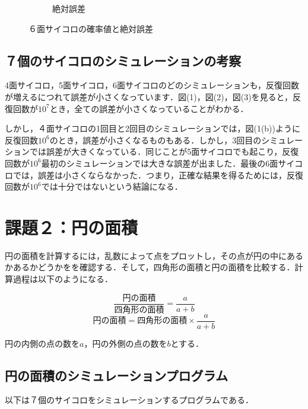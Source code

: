 \documentclass[a4j, titlepage]{jarticle}
\begin{document}
\begin{figure}[htb]
\begin{subfigure}[b]{0.38\textwidth}
          \caption{絶対誤差}
          \label{fig:errdic6}
        \end{subfigure}
        \hfill
            \caption{６面サイコロの確率値と絶対誤差}
            \label{fig:resdic6}
      \end{figure}

    \subsection{７個のサイコロのシミュレーションの考察}
      4面サイコロ，5面サイコロ，6面サイコロのどのシミュレーションも，反復回数が増えるにつれて誤差が小さくなっています．図(1)，図(2)，図(3)を見ると，反復回数が$10^7$とき，全ての誤差が小さくなっていることがわかる．

      しかし，４面サイコロの1回目と2回目のシミュレーションでは，図(1(b))ように反復回数$10^6$のとき，誤差が小さくなるものもある．しかし，3回目のシミュレーションでは誤差が大きくなっている．同じことが5面サイコロでも起こり，反復回数が$10^6$最初のシミュレーションでは大きな誤差が出ました．最後の6面サイコロでは，誤差は小さくならなかった．つまり，正確な結果を得るためには，反復回数が$10^6$では十分ではないという結論になる．
  
  \section{課題２：円の面積}
    円の面積を計算するには，乱数によって点をプロットし，その点が円の中にあるかあるかどうかをを確認する．そして，四角形の面積と円の面積を比較する．計算過程は以下のようになる．
    \begin{screen}
      \begin{equation}
        \frac{円の面積}{四角形の面積} = \frac{a}{a+b} 
      \end{equation}
      \begin{equation}
        円の面積 = 四角形の面積 \times \frac{a}{a+b}
      \end{equation}
    \end{screen}
    円の内側の点の数を$a$，円の外側の点の数を$b$とする．

    \subsection{円の面積のシミュレーションプログラム}
      以下は７個のサイコロをシミュレーションするプログラムである．
       
    
\end{document}
